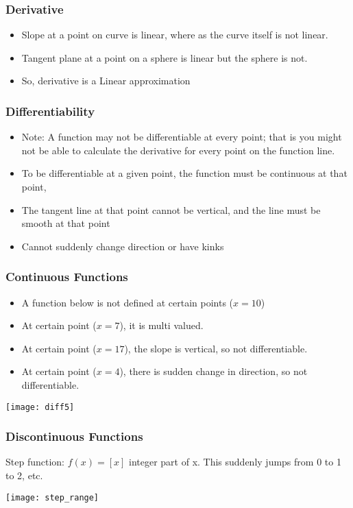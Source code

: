  \begin{frame}[fragile]\frametitle{Derivative}
\begin{itemize}
\item Slope at a point on curve is linear, where as the curve itself is not linear.
\item Tangent plane at a point on a sphere is linear but the sphere is not.
\item So, derivative is a Linear approximation
\end{itemize}
\end{frame}


 \begin{frame}[fragile]\frametitle{Differentiability}
\begin{itemize}
\item Note: A function may not be differentiable at every point; that is you might not be able to calculate the derivative for
every point on the function line. 
\item To be differentiable at a given point, the function must be continuous at that point, 
\item The tangent line at that point cannot be vertical, and the line must be smooth at that point 
\item Cannot suddenly change direction or have kinks
\end{itemize}
\end{frame}

 \begin{frame}[fragile]\frametitle{Continuous Functions}
\begin{itemize}
\item A function below is not defined at certain points ($x = 10$)
\item At certain point ($x = 7$), it is multi valued.
\item At certain point ($x = 17$), the slope is vertical, so not differentiable.
\item At certain point ($x = 4$), there is sudden change in direction, so not differentiable.
\end{itemize}
\begin{center}
\texttt{[image: diff5]}
\end{center}
\end{frame}

 \begin{frame}[fragile]\frametitle{Discontinuous Functions}
Step function: $f(x) = [x]$ integer part of x. This suddenly jumps from 0 to 1 to 2, etc.
\begin{center}
\texttt{[image: step\_range]}
\end{center}
\end{frame}

